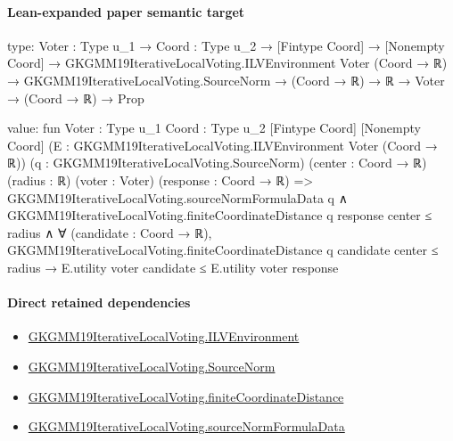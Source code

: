 \documentclass[10pt]{article}
\begin{document}
\paragraph{Lean-expanded paper semantic target}
\begin{ReviewVerbatim}
type:
{Voter : Type u_1} →
  {Coord : Type u_2} →
    [Fintype Coord] →
      [Nonempty Coord] →
        GKGMM19IterativeLocalVoting.ILVEnvironment Voter (Coord → ℝ) →
          GKGMM19IterativeLocalVoting.SourceNorm → (Coord → ℝ) → ℝ → Voter → (Coord → ℝ) → Prop

value:
fun {Voter : Type u_1} {Coord : Type u_2} [Fintype Coord] [Nonempty Coord]
    (E : GKGMM19IterativeLocalVoting.ILVEnvironment Voter (Coord → ℝ)) (q : GKGMM19IterativeLocalVoting.SourceNorm)
    (center : Coord → ℝ) (radius : ℝ) (voter : Voter) (response : Coord → ℝ) =>
  GKGMM19IterativeLocalVoting.sourceNormFormulaData q ∧
    GKGMM19IterativeLocalVoting.finiteCoordinateDistance q response center ≤ radius ∧
      ∀ (candidate : Coord → ℝ),
        GKGMM19IterativeLocalVoting.finiteCoordinateDistance q candidate center ≤ radius →
          E.utility voter candidate ≤ E.utility voter response
\end{ReviewVerbatim}

\paragraph{Direct retained dependencies}
\begin{itemize}\raggedright
\item \hyperlink{governing-declaration-df2ca62df1846667}{GKGMM19\allowbreak{}Iterative\allowbreak{}Local\allowbreak{}Voting.\allowbreak{}ILV\allowbreak{}Environment}
\item \hyperlink{governing-declaration-6fa4ab9852321b03}{GKGMM19\allowbreak{}Iterative\allowbreak{}Local\allowbreak{}Voting.\allowbreak{}Source\allowbreak{}Norm}
\item \hyperlink{governing-declaration-54228ebaec750c58}{GKGMM19\allowbreak{}Iterative\allowbreak{}Local\allowbreak{}Voting.\allowbreak{}finite\allowbreak{}Coordinate\allowbreak{}Distance}
\item \hyperlink{paper-prerequisite-d7774e2d1adfed0f}{GKGMM19\allowbreak{}Iterative\allowbreak{}Local\allowbreak{}Voting.\allowbreak{}source\allowbreak{}Norm\allowbreak{}Formula\allowbreak{}Data}
\end{itemize}
\end{document}
